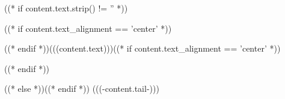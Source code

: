 ((* if content.text.strip() != '' *))\begin{bfseries}((* if content.text_alignment == 'center' *)){\setlength\topsep{0pt}\setlength\parskip{0pt}\begin{center}((* endif *))(((content.text)))((* if content.text_alignment == 'center' *))\end{center}}((* endif *))\end{bfseries}((* else *))((* endif *)) (((-content.tail-)))